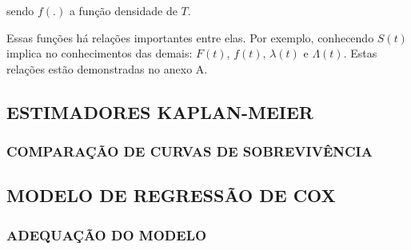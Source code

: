 \noindent sendo $f(.)$ a função densidade de $T$.

Essas funções há relações importantes entre elas. Por exemplo, conhecendo $S(t)$ implica no conhecimentos das demais: $F(t)$, $f(t)$, $\lambda(t)$ e $\Lambda(t)$. Estas relações estão demonstradas no anexo A.

    \subsection{ESTIMADORES KAPLAN-MEIER}
      
      	\subsubsection{COMPARAÇÃO DE CURVAS DE SOBREVIVÊNCIA}
    
    \subsection{MODELO DE REGRESSÃO DE COX}
    
    	\subsubsection{ADEQUAÇÃO DO MODELO}
